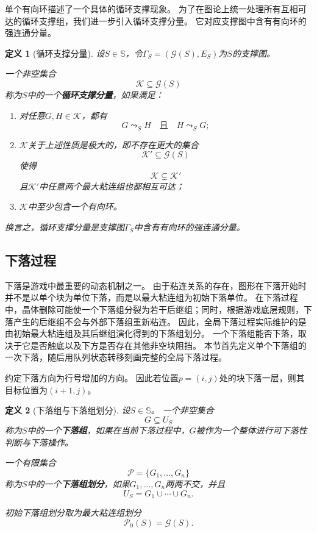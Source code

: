 \documentclass[UTF8,fontset=none]{ctexart}
\theoremstyle{cnthm}
\newtheorem{definition}{定义}[section]
\begin{document}
			单个有向环描述了一个具体的循环支撑现象。
			为了在图论上统一处理所有互相可达的循环支撑组，我们进一步引入循环支撑分量。
			它对应支撑图中含有有向环的强连通分量。
			
			\begin{definition}[循环支撑分量]
				设$S\in\mathbb{S}$，令$\Gamma_S=(\mathcal{G}(S),E_S)$为$S$的支撑图。
				
				一个非空集合
				$$
				\mathcal{K}\subseteq \mathcal{G}(S)
				$$
				称为$S$中的一个\textbf{循环支撑分量}，如果满足：
				\begin{enumerate}
					\item 对任意$G,H\in\mathcal{K}$，都有
					$$
					G\leadsto_S H
					\quad\text{且}\quad
					H\leadsto_S G;
					$$
					\item $\mathcal{K}$关于上述性质是极大的，即不存在更大的集合
					$$
					\mathcal{K}'\subseteq\mathcal{G}(S)
					$$
					使得
					$$
					\mathcal{K}\subsetneq \mathcal{K}'
					$$
					且$\mathcal{K}'$中任意两个最大粘连组也都相互可达；
					\item $\mathcal{K}$中至少包含一个有向环。
				\end{enumerate}
				
				换言之，循环支撑分量是支撑图$\Gamma_S$中含有有向环的强连通分量。
			\end{definition}
			
		\subsection{下落过程}
		
			下落是游戏中最重要的动态机制之一。
			由于粘连关系的存在，图形在下落开始时并不是以单个块为单位下落，而是以最大粘连组为初始下落单位。
			在下落过程中，晶体删除可能使一个下落组分裂为若干后继组；同时，根据游戏底层规则，下落产生的后继组不会与外部下落组重新粘连。
			因此，全局下落过程实际维护的是由初始最大粘连组及其后继组演化得到的下落组划分。
			一个下落组能否下落，取决于它是否触底以及下方是否存在其他非空块阻挡。
			本节首先定义单个下落组的一次下落，随后用队列状态转移刻画完整的全局下落过程。
			
			约定下落方向为行号增加的方向。
			因此若位置$p=(i,j)$处的块下落一层，则其目标位置为$(i+1,j)$。
			
			\begin{definition}[下落组与下落组划分]
				设$S\in\mathbb{S}$。
				一个非空集合
				$$
				G\subseteq U_S
				$$
				称为$S$中的一个\textbf{下落组}，如果在当前下落过程中，$G$被作为一个整体进行可下落性判断与下落操作。
				
				一个有限集合
				$$
				\mathcal{P}=\{G_1,\dots,G_n\}
				$$
				称为$S$中的一个\textbf{下落组划分}，如果$G_1,\dots,G_n$两两不交，并且
				$$
				U_S=G_1\cup\cdots\cup G_n.
				$$
				
				初始下落组划分取为最大粘连组划分
				$$
				\mathcal{P}_0(S)=\mathcal{G}(S).
				$$
			\end{definition}
			
\end{document}

